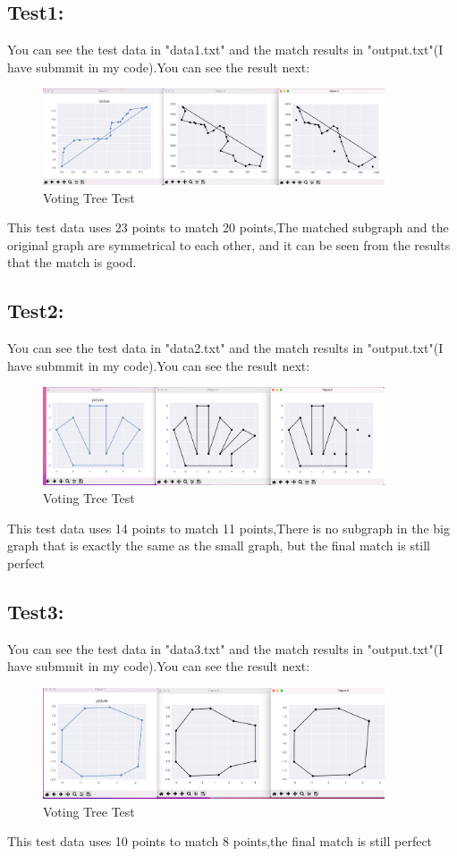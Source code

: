 \documentclass[12pt]{article}
\begin{document}
\subsection*{Test1:}
You can see the test data in "data1.txt" and the match results in "output.txt"(I have submmit in my code).You can see the result next:
    \begin{figure}[H]
	\centering
	\includegraphics[width=0.9\textwidth]{2.png}
	\caption{\label{pr}Voting Tree Test}
	\end{figure}
This test data uses 23 points to match 20 points,The matched subgraph and the original graph are symmetrical to each other, and it can be seen from the results that the match is good.

\subsection*{Test2:}
You can see the test data in "data2.txt" and the match results in "output.txt"(I have submmit in my code).You can see the result next:
    \begin{figure}[H]
	\centering
	\includegraphics[width=0.9\textwidth]{3.png}
	\caption{\label{pr}Voting Tree Test}
	\end{figure}
This test data uses 14 points to match 11 points,There is no subgraph in the big graph that is exactly the same as the small graph, but the final match is still perfect

\subsection*{Test3:}
You can see the test data in "data3.txt" and the match results in "output.txt"(I have submmit in my code).You can see the result next:
    \begin{figure}[H]
	\centering
	\includegraphics[width=0.9\textwidth]{4.png}
	\caption{\label{pr}Voting Tree Test}
	\end{figure}
This test data uses 10 points to match 8 points,the final match is still perfect
\end{document}

